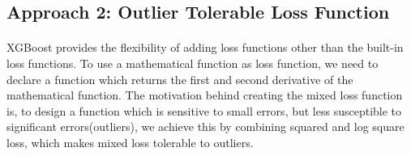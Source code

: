 \documentclass[runningheads]{llncs}
\begin{document}
\subsection{Approach 2: Outlier Tolerable Loss Function}

\paragraph{} XGBoost provides the flexibility of adding loss functions other than the built-in loss functions. To use a mathematical function as loss function, we need to declare a function which returns the first and second derivative of the mathematical function. The motivation behind creating the mixed loss function is, to design a function which is sensitive to small errors, but less susceptible to significant errors(outliers), we achieve this by combining squared and log square loss, which makes mixed loss tolerable to outliers.
\end{document}
